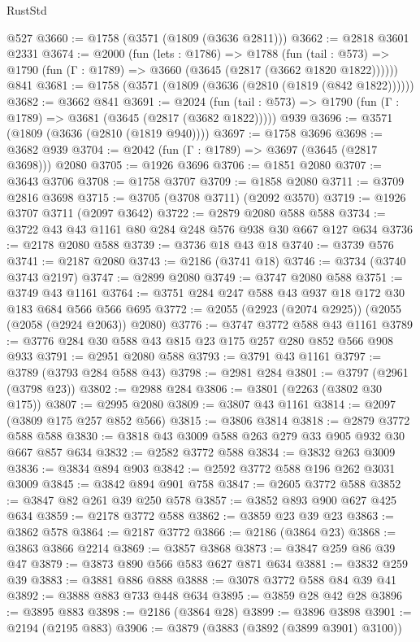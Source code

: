 \begin{lexlean}{RustStd}
\begin{coremodule}
    @527
@3660 := @1758 (@3571 (@1809 (@3636 @2811)))
@3662 := @2818 @3601 @2331
@3674 := @2000
    (fun (lets : @1786) =>
    @1788
      (fun (tail : @573) => @1790 (fun (Γ : @1789) => @3660 (@3645 (@2817 (@3662 @1820 @1822))))))
    @841
@3681 := @1758 (@3571 (@1809 (@3636 (@2810 (@1819 (@842 @1822))))))
@3682 := @3662 @841
@3691 := @2024
    (fun (tail : @573) => @1790 (fun (Γ : @1789) => @3681 (@3645 (@2817 (@3682 @1822)))))
    @939
@3696 := @3571 (@1809 (@3636 (@2810 (@1819 @940))))
@3697 := @1758 @3696
@3698 := @3682 @939
@3704 := @2042 (fun (Γ : @1789) => @3697 (@3645 (@2817 @3698))) @2080
@3705 := @1926 @3696
@3706 := @1851 @2080
@3707 := @3643 @3706
@3708 := @1758 @3707
@3709 := @1858 @2080
@3711 := @3709 @2816 @3698
@3715 := @3705 (@3708 @3711) (@2092 @3570)
@3719 := @1926 @3707 @3711 (@2097 @3642)
@3722 := @2879 @2080 @588 @588
@3734 := @3722 @43 @43 @1161 @80 @284 @248 @576 @938 @30 @667 @127 @634
@3736 := @2178 @2080 @588
@3739 := @3736 @18 @43 @18
@3740 := @3739 @576
@3741 := @2187 @2080
@3743 := @2186 (@3741 @18)
@3746 := @3734 (@3740 @3743 @2197)
@3747 := @2899 @2080
@3749 := @3747 @2080 @588
@3751 := @3749 @43 @1161
@3764 := @3751 @284 @247 @588 @43 @937 @18 @172 @30 @183 @684 @566 @566 @695
@3772 := @2055 (@2923 (@2074 @2925)) (@2055 (@2058 (@2924 @2063)) @2080)
@3776 := @3747 @3772 @588 @43 @1161
@3789 := @3776 @284 @30 @588 @43 @815 @23 @175 @257 @280 @852 @566 @908 @933
@3791 := @2951 @2080 @588
@3793 := @3791 @43 @1161
@3797 := @3789 (@3793 @284 @588 @43)
@3798 := @2981 @284
@3801 := @3797 (@2961 (@3798 @23))
@3802 := @2988 @284
@3806 := @3801 (@2263 (@3802 @30 @175))
@3807 := @2995 @2080
@3809 := @3807 @43 @1161
@3814 := @2097 (@3809 @175 @257 @852 @566)
@3815 := @3806 @3814
@3818 := @2879 @3772 @588 @588
@3830 := @3818 @43 @3009 @588 @263 @279 @33 @905 @932 @30 @667 @857 @634
@3832 := @2582 @3772 @588
@3834 := @3832 @263 @3009
@3836 := @3834 @894 @903
@3842 := @2592 @3772 @588 @196 @262 @3031 @3009
@3845 := @3842 @894 @901 @758
@3847 := @2605 @3772 @588
@3852 := @3847 @82 @261 @39 @250 @578
@3857 := @3852 @893 @900 @627 @425 @634
@3859 := @2178 @3772 @588
@3862 := @3859 @23 @39 @23
@3863 := @3862 @578
@3864 := @2187 @3772
@3866 := @2186 (@3864 @23)
@3868 := @3863 @3866 @2214
@3869 := @3857 @3868
@3873 := @3847 @259 @86 @39 @47
@3879 := @3873 @890 @566 @583 @627 @871 @634
@3881 := @3832 @259 @39
@3883 := @3881 @886 @888
@3888 := @3078 @3772 @588 @84 @39 @41
@3892 := @3888 @883 @733 @448 @634
@3895 := @3859 @28 @42 @28
@3896 := @3895 @883
@3898 := @2186 (@3864 @28)
@3899 := @3896 @3898
@3901 := @2194 (@2195 @883)
@3906 := @3879 (@3883 (@3892 (@3899 @3901) @3100))

\end{coremodule}
\end{lexlean}
